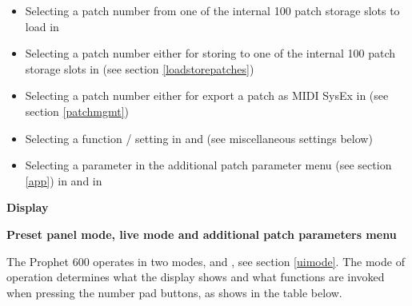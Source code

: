 \documentclass[landscape, 11pt, oneside]{report}
\newenvironment{flowtext}{\addmargin[0cm]{7cm}}{\endaddmargin} %
\begin{document}
\begin{flowtext}
\begin{itemize}
  \item Selecting a patch number from one of the internal 100 patch storage slots to load in \presetpatch  
  \item Selecting a patch number either for storing to one of the internal 100 patch storage slots in \storagemode (see section \ref{loadstorepatches})
  \item Selecting a patch number either for export a patch as MIDI SysEx in \patchmgmt (see section \ref{patchmgmt})
  \item Selecting a function / setting in \shiftmode and \shiftlock (see miscellaneous settings below)  
  \item Selecting a parameter in the additional patch parameter menu (see section \ref{app}) in \presetpanel and in \livemode
\end{itemize} 

\textbf{Display}



\textbf{Preset panel mode, live mode and additional patch parameters menu}\label{app}

The Prophet 600 operates in two modes, \preset and \livemode, see section \ref{uimode}. The mode of operation determines what the display shows and what functions are invoked when pressing the number pad buttons, as shows in the table below.

\end{flowtext}
\end{document}
